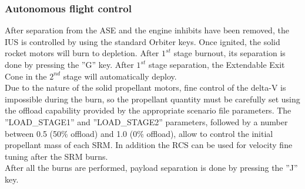 \documentclass[Space_Shuttle_Ultra_Manual.tex]{subfiles}
\begin{document}
\begin{multicols*}{2}
\subsubsection{Autonomous flight control}
After separation from the ASE and the engine inhibits have been removed, the IUS is controlled by using the standard Orbiter keys. Once ignited, the solid rocket motors will burn to depletion. After $1^{st}$ stage burnout, its separation is done by pressing the ''G'' key. After $1^{st}$ stage separation, the Extendable Exit Cone in the $2^{nd}$ stage will automatically deploy.
\\
Due to the nature of the solid propellant motors, fine control of the delta-V is impossible during the burn, so the propellant quantity must be carefully set using the offload capability provided by the appropriate scenario file parameters. The ''LOAD\_STAGE1'' and ''LOAD\_STAGE2'' parameters, followed by a number between 0.5 (50\% offload) and 1.0 (0\% offload), allow to control the initial propellant mass of each SRM. In addition the RCS can be used for velocity fine tuning after the SRM burns.
\\
After all the burns are performed, payload separation is done by pressing the ''J'' key.
\end{multicols*}
\end{document}

